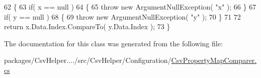 \begin{DoxyCode}
62         \{
63             \textcolor{keywordflow}{if}( x == null )
64             \{
65                 \textcolor{keywordflow}{throw} \textcolor{keyword}{new} ArgumentNullException( \textcolor{stringliteral}{"x"} );
66             \}
67             \textcolor{keywordflow}{if}( y == null )
68             \{
69                 \textcolor{keywordflow}{throw} \textcolor{keyword}{new} ArgumentNullException( \textcolor{stringliteral}{"y"} );
70             \}
71 
72             \textcolor{keywordflow}{return} x.Data.Index.CompareTo( y.Data.Index );
73         \}
\end{DoxyCode}


The documentation for this class was generated from the following file\-:\begin{DoxyCompactItemize}
\item 
packages/\-Csv\-Helper..../src/\-Csv\-Helper/\-Configuration/\hyperlink{a00189}{Csv\-Property\-Map\-Comparer.\-cs}\end{DoxyCompactItemize}
